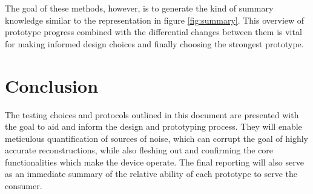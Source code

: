 \documentclass{article}
\begin{document}
The goal of these methods, however, is to generate the kind of summary knowledge similar to the representation in figure \ref{fig:summary}. This overview of prototype progress combined with the differential changes between them is vital for making informed design choices and finally choosing the strongest prototype.

\section{Conclusion}
\label{sec:conclusion}

The testing choices and protocols outlined in this document are presented with the goal to aid and inform the design and prototyping process. They will enable meticulous quantification of sources of noise, which can corrupt the goal of highly accurate reconstructions, while also fleshing out and confirming the core functionalities which make the device operate. The final reporting will also serve as an immediate summary of the relative ability of each prototype to serve the consumer.

\newpage
{}


\end{document}
